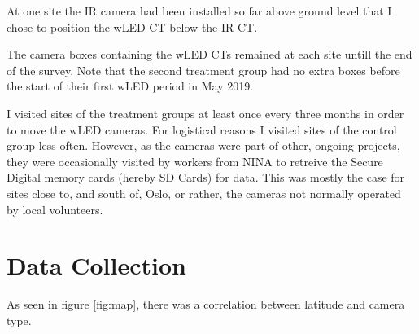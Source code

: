  
At one site the IR camera had been installed so far above ground level that I chose to position the wLED CT below the IR CT. %

The camera boxes containing the wLED CTs remained at each site untill the end of the survey. Note that the second treatment group had no extra boxes  before the start of their first wLED period in May 2019.   





I visited sites of the treatment groups at least once every three months in order to move the wLED cameras.
For logistical reasons I visited sites of the control group less often.
However, as the cameras were part of other, ongoing projects, they were occasionally visited by workers from NINA to retreive the Secure Digital memory cards (hereby SD Cards) for data. %
This was mostly the case for sites close to, and south of, Oslo, or rather, the cameras not normally operated by local volunteers.








\section{Data Collection} 






As seen in figure \ref{fig:map}, %
there was a correlation between latitude and camera type.

